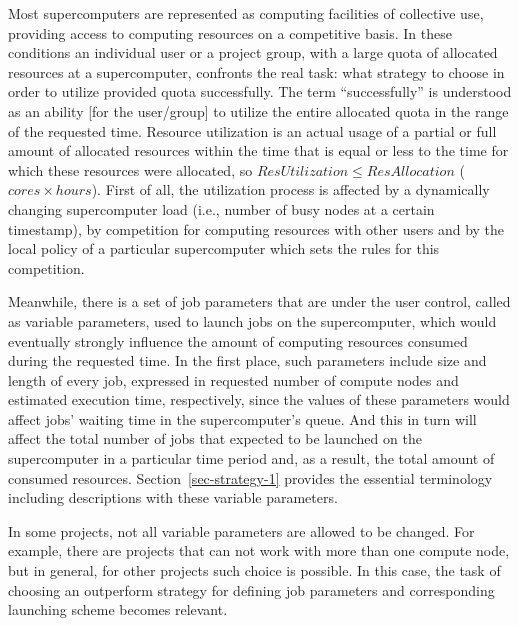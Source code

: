 Most supercomputers are represented as computing facilities of collective
use, providing access to computing resources on a competitive basis.
In these conditions an individual user or a project group, with a large quota
of allocated resources at a supercomputer, confronts the real task: what
strategy to choose in order to utilize provided quota successfully.
The term ``successfully'' is understood as an ability [for the user/group] to
utilize the entire allocated quota in the range of the requested time.
Resource utilization is an actual usage of a partial or full amount of
allocated resources within the time that is equal or less to the time for which
these resources were allocated, so $ResUtilization \leq ResAllocation$
($cores \times hours$).
First of all, the utilization process is affected by a dynamically changing
supercomputer load (i.e., number of busy nodes at a certain timestamp), by
competition for computing resources with other users and by the local policy of
a particular supercomputer which sets the rules for this competition.

Meanwhile, there is a set of job parameters that are under the user control,
called as variable parameters, used to launch jobs on the supercomputer, which
would eventually strongly influence the amount of computing resources consumed
during the requested time.
In the first place, such parameters include size and length of every job,
expressed in requested number of compute nodes and estimated execution time,
respectively, since the values of these parameters would affect jobs' waiting
time in the supercomputer's queue.
And this in turn will affect the total number of jobs that expected to be
launched on the supercomputer in a particular time period and, as a result, the
total amount of consumed resources.
Section~\ref{sec-strategy-1} provides the essential terminology
including descriptions with these variable parameters.


In some projects, not all variable parameters are allowed to be changed.
For example, there are projects that can not work with more than one compute
node, but in general, for other projects such choice is possible.
In this case, the task of choosing an outperform strategy for defining job
parameters and corresponding launching scheme becomes relevant.


